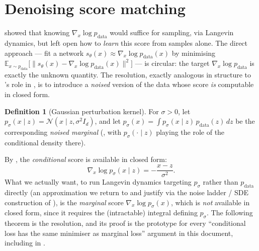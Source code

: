 \documentclass[11pt,a4paper]{report}
\theoremstyle{definition}
\newtheorem{definition}[definition]{Definition}
\theoremstyle{remark}
\newcommand{\EE}{\mathbb E}
\begin{document}
\section{Denoising score matching}
\label{sec:score-matching-intro}

 showed that knowing $\nabla_x\log p_{\mathrm{data}}$
would suffice for sampling, via Langevin dynamics, but left open how to
\emph{learn} this score from samples alone. The direct approach --- fit a
network $s_\theta(x)\approx\nabla_x\log p_{\mathrm{data}}(x)$ by minimising
$\EE_{x\sim p_{\mathrm{data}}}\bigl[\|s_\theta(x)-\nabla_x\log p_{\mathrm{data}}(x)\|^2\bigr]$
--- is circular: the target $\nabla_x\log p_{\mathrm{data}}$ is exactly the
unknown quantity. The resolution, exactly analogous in structure to
's role in ,
is to introduce a \emph{noised} version of the data whose score \emph{is}
computable in closed form.

\begin{definition}[Gaussian perturbation kernel]
\label{def:gaussian-kernel}
For $\sigma>0$, let $p_\sigma(x\mid z) = \mathcal N(x\mid z,\sigma^2I_d)$,
and let $p_\sigma(x) = \int p_\sigma(x\mid z)\,p_{\mathrm{data}}(z)\,dz$ be
the corresponding \emph{noised marginal} (, with
$p_\sigma(\cdot\mid z)$ playing the role of the conditional density there).
\end{definition}

By , the \emph{conditional} score is available in
closed form:
\begin{equation}
\label{eq:gaussian-conditional-score}
\nabla_x\log p_\sigma(x\mid z) = -\frac{x-z}{\sigma^2} .
\end{equation}
What we actually want, to run Langevin dynamics
targeting $p_\sigma$ rather than $p_{\mathrm{data}}$ directly (an
approximation we return to and justify via the noise ladder / SDE
construction of ), is the \emph{marginal} score
$\nabla_x\log p_\sigma(x)$, which is \emph{not} available in closed form,
since it requires the (intractable) integral defining $p_\sigma$. The
following theorem is the resolution, and its proof is the prototype for
every ``conditional loss has the same minimiser as marginal loss'' argument
in this document, including  in
.
\end{document}
